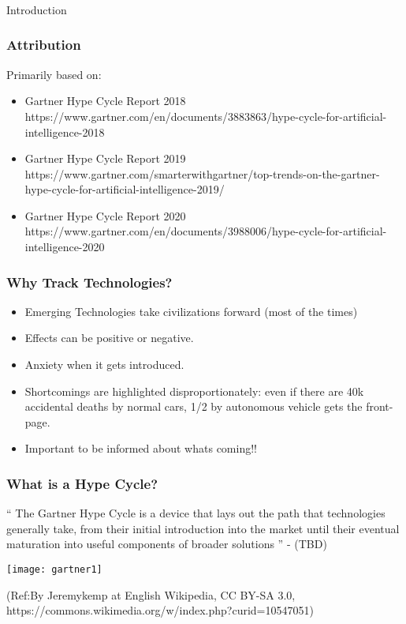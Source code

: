 \begin{frame}[fragile]\frametitle{}
\begin{center}
{\Large Introduction}
\end{center}
\end{frame}

\begin{frame}[fragile]\frametitle{Attribution}

Primarily based on:
\begin{itemize}
\item Gartner Hype Cycle Report 2018 {\tiny https://www.gartner.com/en/documents/3883863/hype-cycle-for-artificial-intelligence-2018}
\item Gartner Hype Cycle Report 2019 {\tiny https://www.gartner.com/smarterwithgartner/top-trends-on-the-gartner-hype-cycle-for-artificial-intelligence-2019/}
\item Gartner Hype Cycle Report 2020 {\tiny https://www.gartner.com/en/documents/3988006/hype-cycle-for-artificial-intelligence-2020}
\end{itemize}
\end{frame}


\begin{frame}[fragile]\frametitle{Why Track Technologies?}

\begin{itemize}
\item Emerging Technologies take civilizations forward (most of the times)
\item Effects can be positive or negative. 
\item Anxiety when it gets introduced.
\item Shortcomings are highlighted disproportionately: even if there are 40k accidental deaths by normal cars, 1/2 by autonomous vehicle gets the front-page.
\item Important to be informed about whats coming!!
\end{itemize}
\end{frame}


\begin{frame}[fragile]\frametitle{What is a Hype Cycle?}

`` The Gartner Hype Cycle is a device that lays out the path that technologies generally take, from their initial introduction into the market until their eventual maturation into useful components of broader solutions '' - (TBD)


\begin{center}
\texttt{[image: gartner1]}
\end{center}

{\tiny (Ref:By Jeremykemp at English Wikipedia, CC BY-SA 3.0, https://commons.wikimedia.org/w/index.php?curid=10547051)}

\end{frame}

